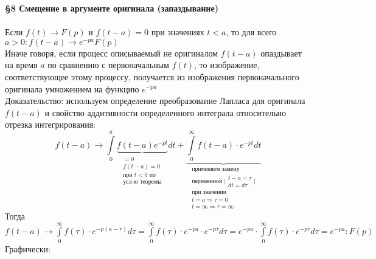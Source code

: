 \documentclass{article}
\numberwithin{equation}{section}
\begin{document}
\textbf{\large{\S8 Смещение в аргументе оригинала (запаздывание)}}
\\\\
Если $f(t)\rightarrow F(p)$ и $f(t-a)=0$ при значениях $t<a$, то для всего $a>0:f(t-a)\rightarrow e^{-pa}F(p)$\\
Иначе говоря, если процесс описываемый не оригиналом $f(t-a)$ опаздывает на время $a$ по сравнению с первоначальным $f(t)$, то изображение, соответствующее этому процессу, получается из изображения первоначального оригинала умножением на функцию $e^{-pa}$\\
Доказательство: используем определение преобразование Лапласа для оригинала $f(t-a)$ и свойство аддитивности определенного интеграла относительно отрезка интегрирования:\\ $$f(t-a)\rightarrow\int\limits_0^a\underbrace{f(t-a)e^{-pt}}_{\begin{matrix}
=0\\
f(t-a)=0\\
\mbox{при }t<0\mbox{ по}\\
\mbox{усл-ю теоремы}
\end{matrix}}dt+\underbrace{\int\limits_0^\infty f(t-a)\cdot e^{-pt}dt}_{\begin{matrix}
\mbox{применяем замену}\\
\mbox{переменной }\Big|\begin{matrix}
t-a=\tau\\
dt=d\tau
\end{matrix}\Big|\\
\mbox{при значении}\\
t=a\Rightarrow\tau=0\\
t=\infty\Rightarrow\tau=\infty
\end{matrix}}$$
Тогда $f(t-a)\rightarrow\int\limits_0^\infty f(\tau)\cdot e^{-p(a-\tau)}d\tau=\int\limits_0^\infty f(\tau)\cdot e^{-pa}\cdot e^{-p\tau}d\tau=e^{-pa}\cdot\int\limits_0^\infty f(\tau)\cdot e^{-p\tau}d\tau=e^{-pa}:F(p)$\\
Графически:\\\\
\\
\end{document}
